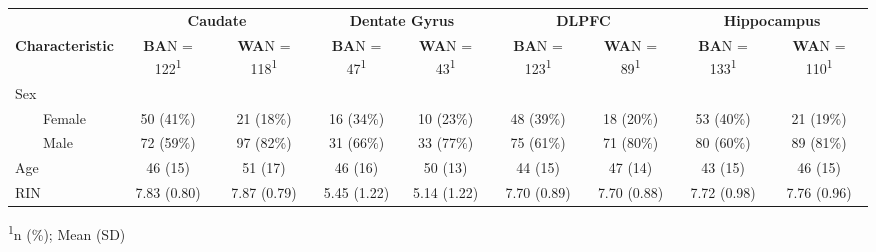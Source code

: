 \setlength{\LTpost}{0mm}
\begin{longtable}{lcccccccc}
\toprule
 & \multicolumn{2}{c}{\textbf{Caudate}} & \multicolumn{2}{c}{\textbf{Dentate Gyrus}} & \multicolumn{2}{c}{\textbf{DLPFC}} & \multicolumn{2}{c}{\textbf{Hippocampus}} \\ 
\cmidrule(lr){2-3} \cmidrule(lr){4-5} \cmidrule(lr){6-7} \cmidrule(lr){8-9}
\textbf{Characteristic} & \textbf{BA}N = 122\textsuperscript{1} & \textbf{WA}N = 118\textsuperscript{1} & \textbf{BA}N = 47\textsuperscript{1} & \textbf{WA}N = 43\textsuperscript{1} & \textbf{BA}N = 123\textsuperscript{1} & \textbf{WA}N = 89\textsuperscript{1} & \textbf{BA}N = 133\textsuperscript{1} & \textbf{WA}N = 110\textsuperscript{1} \\ 
\midrule
Sex &  &  &  &  &  &  &  &  \\ 
    Female & 50 (41\%) & 21 (18\%) & 16 (34\%) & 10 (23\%) & 48 (39\%) & 18 (20\%) & 53 (40\%) & 21 (19\%) \\ 
    Male & 72 (59\%) & 97 (82\%) & 31 (66\%) & 33 (77\%) & 75 (61\%) & 71 (80\%) & 80 (60\%) & 89 (81\%) \\ 
Age & 46 (15) & 51 (17) & 46 (16) & 50 (13) & 44 (15) & 47 (14) & 43 (15) & 46 (15) \\ 
RIN & 7.83 (0.80) & 7.87 (0.79) & 5.45 (1.22) & 5.14 (1.22) & 7.70 (0.89) & 7.70 (0.88) & 7.72 (0.98) & 7.76 (0.96) \\ 
\bottomrule
\end{longtable}
\begin{minipage}{\linewidth}
\textsuperscript{1}n (\%); Mean (SD)\\
\end{minipage}

